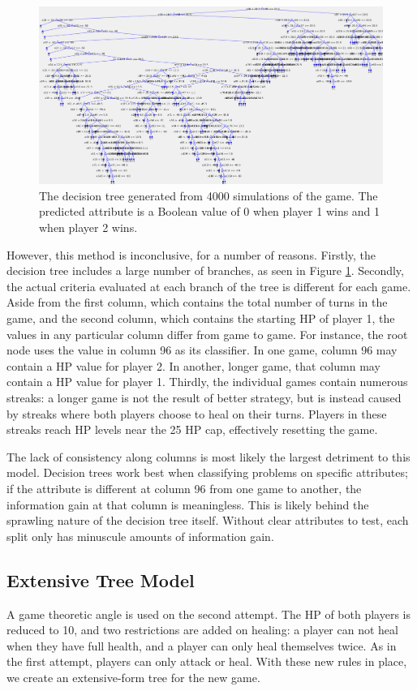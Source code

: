 \begin{figure}[H]
  \centering
  \includegraphics[width=13cm]{figures/firstDecisionTree.png}
  \caption{The decision tree generated from 4000 simulations of the game. The predicted attribute is a Boolean value of 0 when player 1 wins and 1 when player 2 wins.}
  \label{fig:decisionTree1}
\end{figure}

However, this method is inconclusive, for a number of reasons. Firstly, the decision tree includes a  large number of branches, as seen in Figure \ref{fig:decisionTree1}. Secondly, the actual criteria evaluated at each branch of the tree is different for each game. Aside from the first column, which contains the total number of turns in the game, and the second column, which contains the starting HP of player 1, the values in any particular column differ from game to game. For instance, the root node uses the value in column 96 as its classifier. In one game, column 96 may contain a HP value for player 2. In another, longer game, that column may contain a HP value for player 1. Thirdly, the individual games contain numerous streaks: a longer game is not the result of better strategy, but is instead caused by streaks where both players choose to heal on their turns. Players in these streaks reach HP levels near the 25 HP cap, effectively resetting the game.

The lack of consistency along columns is most likely the largest detriment to this model. Decision trees work best when classifying problems on specific attributes; if the attribute is different at column 96 from one game to another, the information gain at that column is meaningless. This is likely behind the sprawling nature of the decision tree itself. Without clear attributes to test, each split only has minuscule amounts of information gain.

\subsection{Extensive Tree Model}
A game theoretic angle is used on the second attempt. The HP of both players is reduced to 10, and two restrictions are added on healing: a player can not heal when they have full health, and a player can only heal themselves twice. As in the first attempt, players can only attack or heal. With these new rules in place, we create an extensive-form tree for the new game.\\

